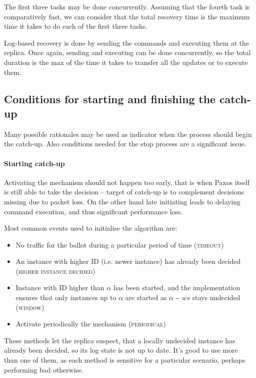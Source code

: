 The first three tasks may be done concurrently. Assuming that the fourth task is comparatively fast, we can consider that the total recovery time is the maximum time it takes to do each of the first three tasks.


Log-based recovery is done by sending the commands and executing them at the replica. Once again, sending and executing can be done concurrently, so the total duration is the max of the time it takes to transfer all the updates or to execute them.

\subsection{Conditions for starting and finishing the catch-up}
\label{subsec:conditions_for_starting_and_finishing_the_catch_up}
Many possible rationales may be used as indicator when the process should begin the catch-up. Also conditions needed for the stop process are a significant issue.

\paragraph*{Starting catch-up}
Activating the mechanism should not happen too early, that is when Paxos itself is still able to take the decision -- target of catch-up is to complement decisions missing due to packet loss. On the other hand late initiating leads to delaying command execution, and thus significant performance loss.

Most common events used to initialise the algorithm are:
\begin{itemize}
  \item No traffic for the ballot during a particular period of time (\textsc{timeout})
  \item An instance with higher ID (i.e. newer instance) has already been decided \\ (\textsc{higher instance decided})
  \item Instance with ID higher than $\alpha$ has been started, and the implementation ensures that only instances up to $\alpha$ are started as $\alpha-ws$ stays undecided (\textsc{window})
  \item Activate periodically the mechanism (\textsc{periodical})
\end{itemize}

These methods let the replica suspect, that a locally undecided instance has already been decided, so its log state is not up to date. It's good to use more than one of them, as each method is sensitive for a particular scenario, perhaps performing bad otherwise.

